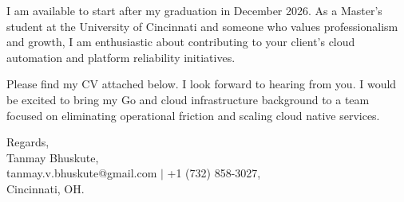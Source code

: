 \documentclass[11pt]{letter}
\begin{document}
\begin{letter}{}
I am available to start after my graduation in December 2026. As a Master's student at the University of Cincinnati and someone who values professionalism and growth, I am enthusiastic about contributing to your client's cloud automation and platform reliability initiatives.

Please find my CV attached below. I look forward to hearing from you. I would be excited to bring my Go and cloud infrastructure background to a team focused on eliminating operational friction and scaling cloud native services.

{\setlength{\parskip}{0pt}
Regards,\\
Tanmay Bhuskute,\\
tanmay.v.bhuskute@gmail.com $\mid$ +1 (732) 858-3027,\\
Cincinnati, OH.
}

\end{letter}
\end{document}
